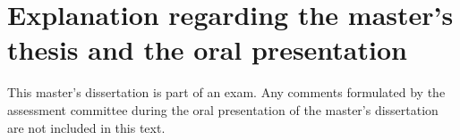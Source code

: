 \chapter*{Explanation regarding the master's thesis and the oral presentation}


This master's dissertation is part of an exam. Any comments formulated by the assessment committee during the oral presentation of the master's dissertation are not included in this text.